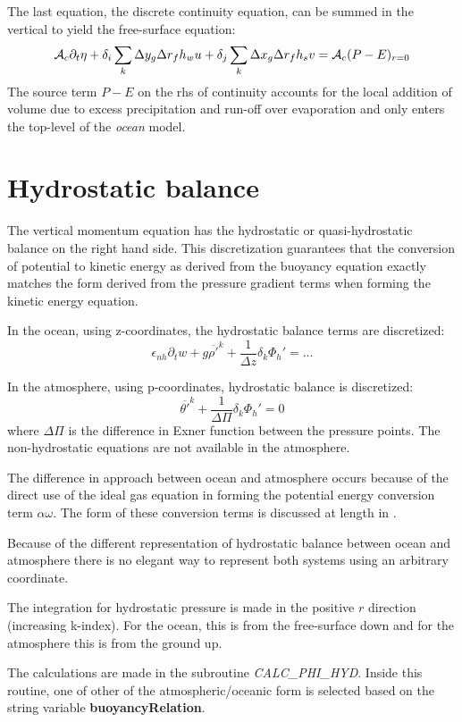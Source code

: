 The last equation, the discrete continuity equation, can be summed in
the vertical to yield the free-surface equation:
\begin{equation}
{\cal A}_c \partial_t \eta + \delta_i \sum_k \Delta y_g \Delta r_f h_w
u + \delta_j \sum_k \Delta x_g \Delta r_f h_s v = {\cal
A}_c(P-E)_{r=0} \label{eq:discrete-freesurface}
\end{equation}
The source term $P-E$ on the rhs of continuity accounts for the local
addition of volume due to excess precipitation and run-off over
evaporation and only enters the top-level of the {\em ocean} model.

\section{Hydrostatic balance}

The vertical momentum equation has the hydrostatic or
quasi-hydrostatic balance on the right hand side. This discretization
guarantees that the conversion of potential to kinetic energy as
derived from the buoyancy equation exactly matches the form derived
from the pressure gradient terms when forming the kinetic energy
equation.

In the ocean, using z-coordinates, the hydrostatic balance terms are
discretized:
\begin{equation}
\epsilon_{nh} \partial_t w
+ g \overline{\rho'}^k + \frac{1}{\Delta z} \delta_k \Phi_h' = \ldots
\label{eq:discrete_hydro_ocean}
\end{equation}

In the atmosphere, using p-coordinates, hydrostatic balance is
discretized:
\begin{equation}
\overline{\theta'}^k + \frac{1}{\Delta \Pi} \delta_k \Phi_h' = 0
\label{eq:discrete_hydro_atmos}
\end{equation}
where $\Delta \Pi$ is the difference in Exner function between the
pressure points. The non-hydrostatic equations are not available in
the atmosphere.

The difference in approach between ocean and atmosphere occurs because
of the direct use of the ideal gas equation in forming the potential
energy conversion term $\alpha \omega$. The form of these conversion
terms is discussed at length in \cite{Adcroft01}.

Because of the different representation of hydrostatic balance between
ocean and atmosphere there is no elegant way to represent both systems
using an arbitrary coordinate.

The integration for hydrostatic pressure is made in the positive $r$
direction (increasing k-index). For the ocean, this is from the
free-surface down and for the atmosphere this is from the ground up.

The calculations are made in the subroutine {\em
CALC\_PHI\_HYD}. Inside this routine, one of other of the
atmospheric/oceanic form is selected based on the string variable {\bf
buoyancyRelation}.

